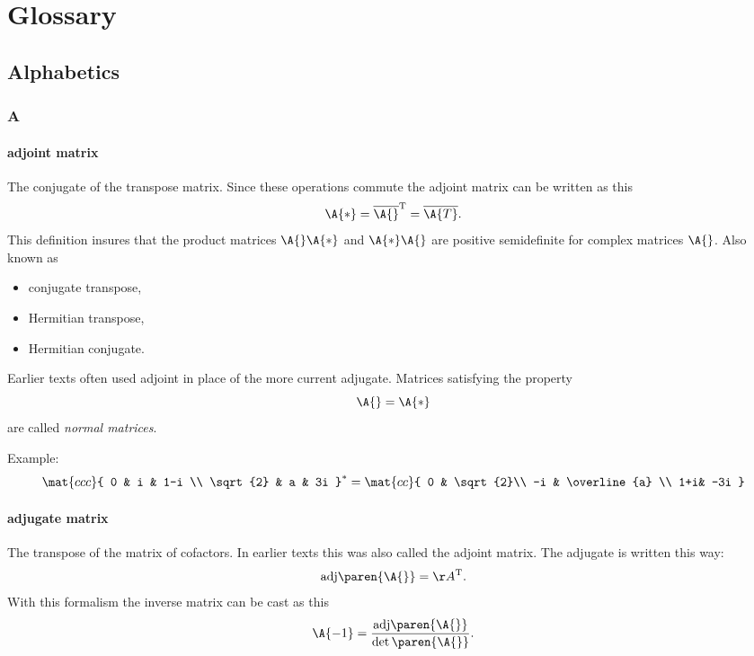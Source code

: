 \chapter*{Glossary}

\section*{Alphabetics}

\subsection*{A} 

\subsubsection*{adjoint matrix}
The conjugate of the transpose matrix. Since these operations commute the adjoint matrix can be written as this
\begin{equation}
  \A{*} = \overline{\A{}}^{\mathrm{T}} = \overline{\A{T}}.
\end{equation}
This definition insures that the product matrices $\A{}\A{*}$ and $\A{*}\A{}$ are positive semidefinite for complex matrices $\A{}$.
Also known as 
\begin{itemize}
\item conjugate transpose,
\item Hermitian transpose,
\item Hermitian conjugate.
\end{itemize}
Earlier texts often used adjoint in place of the more current adjugate. Matrices satisfying the property
\begin{equation}
  \A{}=\A{*}
\end{equation}
are called \textit{normal matrices}.

Example:
\begin{equation}
\mat{ccc}
{
0 & i & 1-i \\
\sqrt{2} & a & 3i
}^{*}
=
\mat{cc}
{
0  & \sqrt{2}\\
-i & \overline{a} \\
1+i& -3i
}
\end{equation}

\subsubsection*{adjugate matrix}
The transpose of the matrix of cofactors. In earlier texts this was also called the adjoint matrix. The adjugate is written this way:
\begin{equation}
  \text{adj}\paren{\A{}}=\AA^{\mathrm{T}}.
\end{equation}
With this formalism the inverse matrix can be cast as this
\begin{equation}
  \A{-1}=\frac{\text{adj}\paren{\A{}}}{\det \paren{\A{}}}.
\end{equation}

